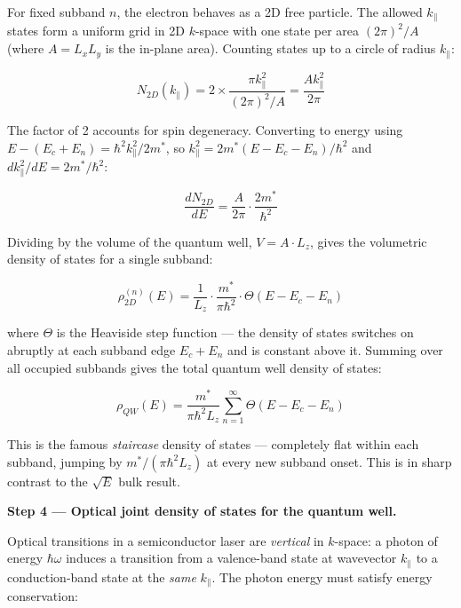 For fixed subband $n$, the electron behaves as a 2D free particle. The allowed $k_\parallel$ states form a uniform grid in 2D $k$-space with one state per area $(2\pi)^2 / A$ (where $A = L_x L_y$ is the in-plane area). Counting states up to a circle of radius $k_\parallel$:

\begin{equation*}
  N_{2D}(k_\parallel) = 2 \times \frac{\pi k_\parallel^2}{(2\pi)^2 / A} = \frac{A k_\parallel^2}{2\pi}
\end{equation*}

The factor of 2 accounts for spin degeneracy. Converting to energy using $E - (E_c + E_n) = \hbar^2 k_\parallel^2 / 2m^*$, so $k_\parallel^2 = 2m^*(E - E_c - E_n)/\hbar^2$ and $dk_\parallel^2/dE = 2m^*/\hbar^2$:

\begin{equation*}
  \frac{dN_{2D}}{dE} = \frac{A}{2\pi} \cdot \frac{2m^*}{\hbar^2}
\end{equation*}

Dividing by the volume of the quantum well, $V = A \cdot L_z$, gives the volumetric density of states for a single subband:

\begin{equation*}
  \rho_{2D}^{(n)}(E) = \frac{1}{L_z} \cdot \frac{m^*}{\pi\hbar^2} \cdot \Theta(E - E_c - E_n)
\end{equation*}

where $\Theta$ is the Heaviside step function — the density of states switches on abruptly at each subband edge $E_c + E_n$ and is constant above it. Summing over all occupied subbands gives the total quantum well density of states:

\begin{equation*}
  \boxed{\rho_{QW}(E) = \frac{m^*}{\pi\hbar^2 L_z}\sum_{n=1}^{\infty}\Theta(E - E_c - E_n)}
\end{equation*}

This is the famous \emph{staircase} density of states — completely flat within each subband, jumping by $m^*/(\pi\hbar^2 L_z)$ at every new subband onset. This is in sharp contrast to the $\sqrt{E}$ bulk result.

\textbf{Step 4 — Optical joint density of states for the quantum well.}

Optical transitions in a semiconductor laser are \emph{vertical} in $k$-space: a photon of energy $\hbar\omega$ induces a transition from a valence-band state at wavevector $k_\parallel$ to a conduction-band state at the \emph{same} $k_\parallel$. The photon energy must satisfy energy conservation:

